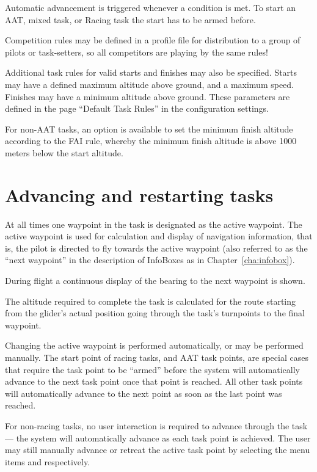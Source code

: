 Automatic advancement is triggered whenever a condition is met. To start an AAT,
mixed task, or Racing task the start has to be armed before. 

\tip Competition rules may be defined in a profile file for
distribution to a group of pilots or task-setters, so all competitors
are playing by the same rules!

Additional task rules for valid starts and finishes may also be
specified.  Starts may have a defined maximum altitude above ground,
and a maximum speed.  Finishes may have a minimum altitude above
ground.  These parameters are defined in the page ``Default Task Rules'' in
the configuration  settings.

For non-AAT tasks, an option is available to set the minimum finish
altitude according to the FAI rule, whereby the minimum finish
altitude is above 1000 meters below the start altitude.




\section{Advancing and restarting tasks}\label{sec:advanc-rest-tasks}
At all times one waypoint in the task is designated as the active
waypoint.  The active waypoint is used for calculation and display of
navigation information, that is, the pilot is directed to fly towards
the active waypoint (also referred to as the ``next waypoint'' in the
description of InfoBoxes as in Chapter~\ref{cha:infobox}).

During flight a continuous display of the bearing to the next waypoint is shown.

The altitude required to complete the task is calculated for the route starting
from the glider's actual position going through the task's turnpoints to the 
final waypoint.

Changing the active waypoint is performed automatically, or may be performed manually.
The start point of racing tasks, and AAT task points, are special cases that require
the task point to be ``armed'' before the system will automatically advance to the next
task point once that point is reached.  All other task points will automatically
advance to the next point as soon as the last point was reached.

For non-racing tasks, no user interaction is required to
advance through the task --- the system will automatically advance as
each task point is achieved.  The user may still manually advance or retreat the active
task point by selecting the menu items \blink{} and
\blink{} respectively.

